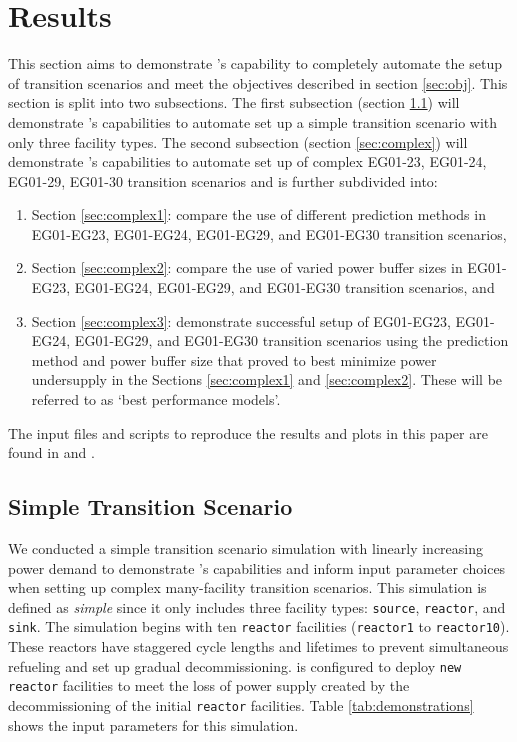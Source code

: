 \section{Results}
This section aims to demonstrate \deploy's capability to completely automate the setup of 
transition scenarios and meet the objectives described in section 
\ref{sec:obj}. 
This section is split into two subsections. 
The first subsection (section \ref{sec:demo}) will demonstrate \deploy's capabilities 
to automate set up a simple transition scenario with only three facility types. 
The second subsection (section \ref{sec:complex}) will demonstrate \deploy's capabilities to
automate set up of complex EG01-23, EG01-24, EG01-29, EG01-30 transition scenarios and is further 
subdivided into:  
\begin{enumerate}
\item Section \ref{sec:complex1}: compare the use of different \deploy prediction methods in EG01-EG23, EG01-EG24, 
EG01-EG29, and EG01-EG30 transition scenarios, 
\item Section \ref{sec:complex2}: compare the use of varied power buffer sizes in EG01-EG23, EG01-EG24, 
EG01-EG29, and EG01-EG30 transition scenarios, and
\item Section \ref{sec:complex3}: demonstrate successful \deploy setup of EG01-EG23, EG01-EG24, 
EG01-EG29, and EG01-EG30 transition scenarios using the prediction method and 
power buffer size that proved to best minimize power undersupply in the Sections 
\ref{sec:complex1} and \ref{sec:complex2}. 
These will be referred to as `best performance models'. 
\end{enumerate}
The input files and scripts to reproduce the results and plots in this
paper are found in \cite{chee_arfc/d3ploy:_2019} and 
\cite{bae_arfctransition-scenarios_2019}. 

\subsection{Simple Transition Scenario}
\label{sec:demo}
We conducted a simple transition scenario simulation with
linearly increasing power demand
to demonstrate \deploy's capabilities and inform input parameter 
choices when setting up complex many-facility transition scenarios. 
This simulation is defined as \textit{simple} since 
it only includes
three facility types: \texttt{source}, \texttt{reactor}, and 
\texttt{sink}. 
The simulation begins with ten \texttt{reactor} facilities 
(\texttt{reactor1} to \texttt{reactor10}). 
These reactors have staggered cycle lengths and lifetimes to prevent 
simultaneous refueling and set up gradual decommissioning. 
\deploy is configured to deploy \texttt{new reactor} facilities
to meet the loss of power supply created by the decommissioning 
of the initial \texttt{reactor} facilities. 
Table \ref{tab:demonstrations} shows the \deploy input parameters 
for this simulation.  

